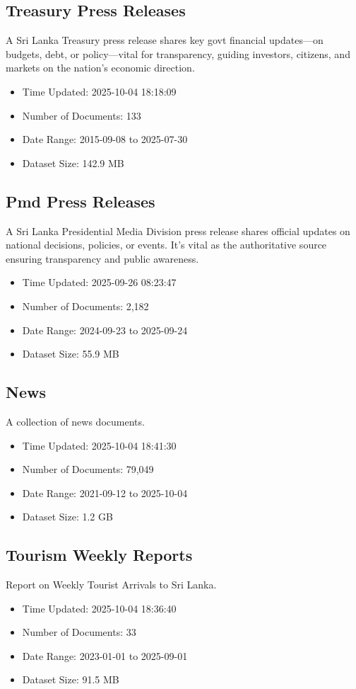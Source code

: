 \documentclass[11pt,a4paper,twocolumn]{article}%
\begin{document}
%
\subsection{Treasury Press Releases}%
\label{subsec:TreasuryPressReleases}%
A Sri Lanka Treasury press release shares key govt financial updates—on budgets, debt, or policy—vital for transparency, guiding investors, citizens, and markets on the nation’s economic direction.%
\begin{itemize}%
\item%
Time Updated: 2025{-}10{-}04 18:18:09%
\item%
Number of Documents: 133%
\item%
Date Range: 2015{-}09{-}08 to 2025{-}07{-}30%
\item%
Dataset Size: 142.9 MB%
\end{itemize}

%
\subsection{Pmd Press Releases}%
\label{subsec:PmdPressReleases}%
A Sri Lanka Presidential Media Division press release shares official updates on national decisions, policies, or events. It’s vital as the authoritative source ensuring transparency and public awareness.%
\begin{itemize}%
\item%
Time Updated: 2025{-}09{-}26 08:23:47%
\item%
Number of Documents: 2,182%
\item%
Date Range: 2024{-}09{-}23 to 2025{-}09{-}24%
\item%
Dataset Size: 55.9 MB%
\end{itemize}

%
\subsection{News}%
\label{subsec:News}%
A collection of news documents.%
\begin{itemize}%
\item%
Time Updated: 2025{-}10{-}04 18:41:30%
\item%
Number of Documents: 79,049%
\item%
Date Range: 2021{-}09{-}12 to 2025{-}10{-}04%
\item%
Dataset Size: 1.2 GB%
\end{itemize}

%
\subsection{Tourism Weekly Reports}%
\label{subsec:TourismWeeklyReports}%
Report on Weekly Tourist Arrivals to Sri Lanka.%
\begin{itemize}%
\item%
Time Updated: 2025{-}10{-}04 18:36:40%
\item%
Number of Documents: 33%
\item%
Date Range: 2023{-}01{-}01 to 2025{-}09{-}01%
\item%
Dataset Size: 91.5 MB%
\end{itemize}
\end{document}
